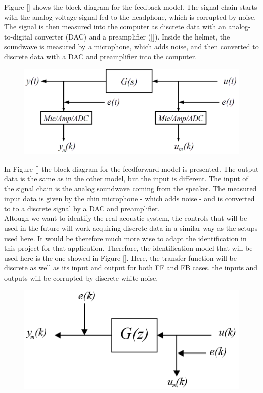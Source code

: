 Figure \ref{} shows the block diagram for the feedback model. The signal chain starts with the analog voltage signal fed to the headphone, which is corrupted by noise. The signal is then measured into the computer as discrete data with an analog-to-digital converter (DAC) and a preamplifier (\ref{}). Inside the helmet, the soundwave is measured by a microphone, which adds noise, and then converted to discrete data with a DAC and preamplifier into the computer.  \\

\begin{figure}[H]
\centering
\includegraphics[width=1.0\textwidth]{pics/modelff}
\caption{}
\label{pic:}
\end{figure}

In Figure \ref{} the block diagram for the feedforward model is presented. The output data is the same as in the other model, but the input is different. The input of the signal chain is the analog soundwave coming from the speaker. The measured input data is given by the chin microphone - which adds noise - and is converted to to a discrete signal by a DAC and preamplifier.\\

Altough we want to identify the real acoustic system, the controls that will be used in the future will work acquiring discrete data in a similar way as the setups used here. It would be therefore much more wise to adapt the identification in this project for that application. Therefore, the identification model that will be used here is the one showed in Figure \ref{}. Here, the transfer function will be discrete as well as its input and output for both FF and FB cases. the inputs and outputs will be corrupted by discrete white noise.

  \begin{figure}[H]
\centering
\includegraphics[width=1.0\textwidth]{pics/discrete_model}
\caption{}
\label{pic:}
\end{figure}




